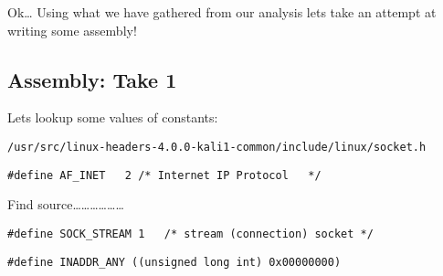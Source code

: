 \documentclass[11pt]{article}
\begin{document}
Ok\ldots{} Using what we have gathered from our analysis lets take an attempt at
writing some assembly!

\subsection{Assembly: Take 1}
\label{sec-1-5}

Lets lookup some values of constants:

\verb~/usr/src/linux-headers-4.0.0-kali1-common/include/linux/socket.h~

\begin{verbatim}
#define AF_INET   2 /* Internet IP Protocol   */
\end{verbatim}

Find source\ldots{}\ldots{}\ldots{}\ldots{}\ldots{}\ldots{}

\begin{verbatim}
#define SOCK_STREAM 1   /* stream (connection) socket */
\end{verbatim}


\begin{verbatim}
#define INADDR_ANY ((unsigned long int) 0x00000000)
\end{verbatim}
\end{document}
